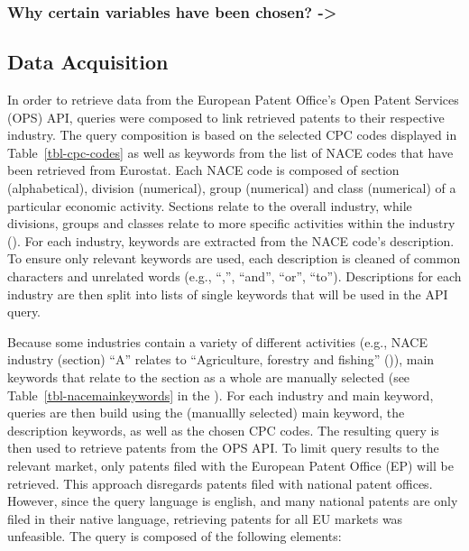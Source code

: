\documentclass[
  11,
  a4paperpaper,
]{article}
\begin{document}

\subsubsection{Why certain variables have been chosen?
-\textgreater{}}\label{why-certain-variables-have-been-chosen--}

\subsection{Data Acquisition}\label{sec-data-acquisition}

In order to retrieve data from the European Patent Office's Open Patent
Services (OPS) API, queries were composed to link retrieved patents to
their respective industry. The query composition is based on the
selected CPC codes displayed in Table~\ref{tbl-cpc-codes} as well as
keywords from the list of NACE codes that have been retrieved from
Eurostat. Each NACE code is composed of section (alphabetical), division
(numerical), group (numerical) and class (numerical) of a particular
economic activity. Sections relate to the overall industry, while
divisions, groups and classes relate to more specific activities within
the industry (). For each
industry, keywords are extracted from the NACE code's description. To
ensure only relevant keywords are used, each description is cleaned of
common characters and unrelated words (e.g., ``,'', ``and'', ``or'',
``to''). Descriptions for each industry are then split into lists of
single keywords that will be used in the API query.

Because some industries contain a variety of different activities (e.g.,
NACE industry (section) ``A'' relates to ``Agriculture, forestry and
fishing'' ()),
main keywords that relate to the section as a whole are manually
selected (see Table~\ref{tbl-nacemainkeywords} in the
). For each industry and main keyword, queries are
then build using the (manuallly selected) main keyword, the description
keywords, as well as the chosen CPC codes. The resulting query is then
used to retrieve patents from the OPS API. To limit query results to the
relevant market, only patents filed with the European Patent Office (EP)
will be retrieved. This approach disregards patents filed with national
patent offices. However, since the query language is english, and many
national patents are only filed in their native language, retrieving
patents for all EU markets was unfeasible. The query is composed of the
following elements:
\end{document}
